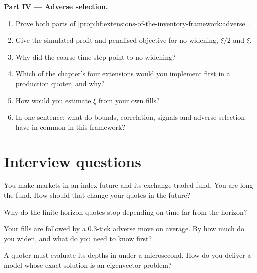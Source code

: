 \begin{problem}
\medskip\noindent\textbf{Part IV --- Adverse selection.}
\begin{enumerate}[resume]
\item Prove both parts of \cref{prop:hf:extensions-of-the-inventory-framework:adverse}.
\item Give the simulated profit and penalised objective for no widening, $\xi/2$ and $\xi$.
\item Why did the coarse time step point to no widening?
\item Which of the chapter's four extensions would you implement first in a production quoter, and why?
\item How would you estimate $\xi$ from your own fills?
\item In one sentence: what do bounds, correlation, signals and adverse selection have in common in this framework?
\end{enumerate}
\end{problem}

\section{Interview questions}

\begin{interviewq}\label{iq:hf:extensions-of-the-inventory-framework:1}
You make markets in an index future and its exchange-traded fund. You are long the fund. How should that change your quotes in the future?
\end{interviewq}

\begin{interviewq}\label{iq:hf:extensions-of-the-inventory-framework:2}
Why do the finite-horizon quotes stop depending on time far from the horizon?
\end{interviewq}

\begin{interviewq}\label{iq:hf:extensions-of-the-inventory-framework:3}
Your fills are followed by a 0.3-tick adverse move on average. By how much do you widen, and what do you need to know first?
\end{interviewq}

\begin{interviewq}\label{iq:hf:extensions-of-the-inventory-framework:4}
A quoter must evaluate its depths in under a microsecond. How do you deliver a model whose exact solution is an eigenvector problem?
\end{interviewq}

